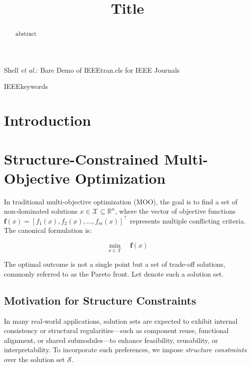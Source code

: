 \def\CTeXPreproc{Created by ctex v0.2.14, don't edit!}\documentclass[journal]{IEEEtran}
\begin{document}
\title{Title}

\author{
}

{Shell \MakeLowercase{\textit{et al.}}: Bare Demo of IEEEtran.cls for IEEE Journals}
\maketitle


\begin{abstract}
abstract
\end{abstract}


\begin{IEEEkeywords}
IEEEkeywords
\end{IEEEkeywords}
\IEEEpeerreviewmaketitle


\section{Introduction}

\section*{Structure-Constrained Multi-Objective Optimization}

In traditional multi-objective optimization (MOO), the goal is to find a set of non-dominated solutions $x \in \mathcal{X} \subseteq \mathbb{R}^n$, where the vector of objective functions $\mathbf{f}(x) = [f_1(x), f_2(x), \dots, f_m(x)]^\top$ represents multiple conflicting criteria. The canonical formulation is:

\begin{equation}
\min_{x \in \mathcal{X}} \quad \mathbf{f}(x)
\label{eq:standard_mop}
\end{equation}

The optimal outcome is not a single point but a set of trade-off solutions, commonly referred to as the Pareto front. Let  denote such a solution set.

\subsection*{Motivation for Structure Constraints}

In many real-world applications, solution sets are expected to exhibit internal consistency or structural regularities—such as component reuse, functional alignment, or shared submodules—to enhance feasibility, reusability, or interpretability. To incorporate such preferences, we impose \emph{structure constraints} over the solution set $\mathcal{S}$.
\end{document}
